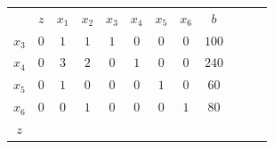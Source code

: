 \begin{frame}
	{
		\begin{table}
			\begin{tabular}{c c c c c c c c c c c c}
				& \cellcolor{blue!80} \color{white} $ \scriptstyle z$
				& \cellcolor{blue!80} \color{white} $ \scriptstyle x_1$ 
				& \cellcolor{blue!80} \color{white} $ \scriptstyle x_2$
				& \cellcolor{blue!80} \color{red} $ \scriptstyle x_3$
				& \cellcolor{blue!80} \color{red} $ \scriptstyle x_4$
				& \cellcolor{blue!80} \color{red} $ \scriptstyle x_5$
				& \cellcolor{blue!80} \color{red} $ \scriptstyle x_6$ 
				& \cellcolor{blue!80} \color{white} $ \scriptstyle b$ \\
				\cellcolor{blue!80} \color{red} $ \scriptstyle x_3$
				& \cellcolor{yellow!60}  $ \scriptstyle 0$
				& \cellcolor{yellow!60}  $ \scriptstyle 1$ 
				& \cellcolor{yellow!60}  $ \scriptstyle 1$
				& \cellcolor{yellow!60}  $ \scriptstyle 1$
				& \cellcolor{yellow!60}  $ \scriptstyle 0$
				& \cellcolor{yellow!60}  $ \scriptstyle 0$
				& \cellcolor{yellow!60}  $ \scriptstyle 0$ 
				& \cellcolor{yellow!60}  $ \scriptstyle 100$ \\ 
				\cellcolor{blue!80} \color{red} $ \scriptstyle x_4$
				& \cellcolor{yellow!60}  $ \scriptstyle 0$
				& \cellcolor{yellow!60}  $ \scriptstyle 3$ 
				& \cellcolor{yellow!60}  $ \scriptstyle 2$
				& \cellcolor{yellow!60}  $ \scriptstyle 0$
				& \cellcolor{yellow!60}  $ \scriptstyle 1$
				& \cellcolor{yellow!60}  $ \scriptstyle 0$
				& \cellcolor{yellow!60}  $ \scriptstyle 0$ 
				& \cellcolor{yellow!60}  $ \scriptstyle 240$ \\ 
				\cellcolor{blue!80} \color{red} $ \scriptstyle x_5$  
				& \cellcolor{yellow!60}  $ \scriptstyle 0$
				& \cellcolor{yellow!60}  $ \scriptstyle 1$ 
				& \cellcolor{yellow!60}  $ \scriptstyle 0$
				& \cellcolor{yellow!60}  $ \scriptstyle 0$
				& \cellcolor{yellow!60}  $ \scriptstyle 0$
				& \cellcolor{yellow!60}  $ \scriptstyle 1$
				& \cellcolor{yellow!60}  $ \scriptstyle 0$ 
				& \cellcolor{yellow!60}  $ \scriptstyle 60$ \\
				\cellcolor{blue!80} \color{red} $ \scriptstyle x_6$
				& \cellcolor{yellow!60}  $ \scriptstyle 0$
				& \cellcolor{yellow!60}  $ \scriptstyle 0$ 
				& \cellcolor{yellow!60}  $ \scriptstyle 1$
				& \cellcolor{yellow!60}  $ \scriptstyle 0$
				& \cellcolor{yellow!60}  $ \scriptstyle 0$
				& \cellcolor{yellow!60}  $ \scriptstyle 0$
				& \cellcolor{yellow!60}  $ \scriptstyle 1$ 
				& \cellcolor{yellow!60}  $ \scriptstyle 80$ \\
				\cellcolor{blue!80} \color{white} $ \scriptstyle z$

\end{tabular}
\end{table}}
\end{frame}
